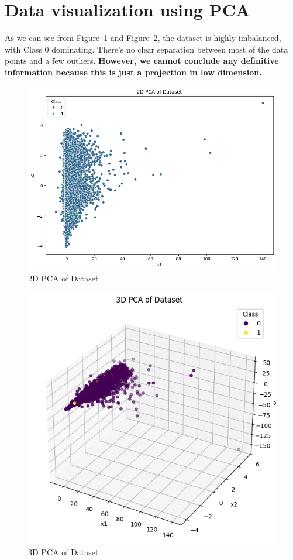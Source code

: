 
\section{Data visualization using PCA}

As we can see from Figure~\ref{fig:PCA_2D} and Figure~\ref{fig:PCA_3D}, the dataset is highly imbalanced, with Class 0 dominating. There's no clear separation between most of the data points and a few outliers. \textbf{However, we cannot conclude any definitive information because this is just a projection in low dimension.}




\begin{figure}[h]
    \centering
    \includegraphics[width=0.5\linewidth]{PCA_2D.png}
    \caption{2D PCA of Dataset}
    \label{fig:PCA_2D}
\end{figure}


\begin{figure}[h]
    \centering
    \includegraphics[width=0.5\linewidth]{3D PCA of Dataset.png}
    \caption{3D PCA of Dataset}
    \label{fig:PCA_3D}
\end{figure}